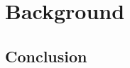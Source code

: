 \chapter{Background} \label{ch:background}
\graphicspath{{Background/figures/}}

\section{Conclusion} \label{sec:conclusion}


